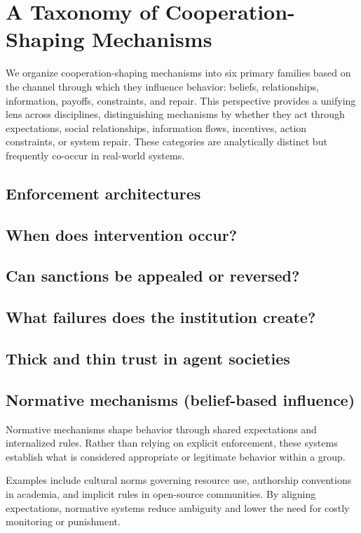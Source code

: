 {\section{A Taxonomy of Cooperation-Shaping Mechanisms}

We organize cooperation-shaping mechanisms into six primary families based on the channel through which they influence behavior: beliefs, relationships, information, payoffs, constraints, and repair. This perspective provides a unifying lens across disciplines, distinguishing mechanisms by whether they act through expectations, social relationships, information flows, incentives, action constraints, or system repair. These categories are analytically distinct but frequently co-occur in real-world systems.

\subsection{Enforcement architectures}
\subsection{When does intervention occur?}
\subsection{Can sanctions be appealed or reversed?}
\subsection{What failures does the institution create?}
\subsection{Thick and thin trust in agent societies}


\subsection{Normative mechanisms (belief-based influence)}
Normative mechanisms shape behavior through shared expectations and internalized rules. Rather than relying on explicit enforcement, these systems establish what is considered appropriate or legitimate behavior within a group.

Examples include cultural norms governing resource use, authorship conventions in academia, and implicit rules in open-source communities. By aligning expectations, normative systems reduce ambiguity and lower the need for costly monitoring or punishment.

}

